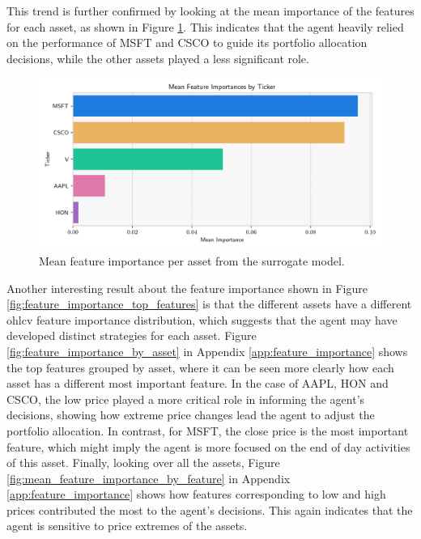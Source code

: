 This trend is further confirmed by looking at the mean importance of the features for each asset, as shown in Figure \ref{fig:mean_feature_importance_by_asset}. This indicates that the agent heavily relied on the performance of MSFT and CSCO to guide its portfolio allocation decisions, while the other assets played a less significant role. 

\begin{figure}
    \centering
    \includegraphics[width=\textwidth]{figures/feature_importance_mean_ticker.png}
    \caption{Mean feature importance per asset from the surrogate model.}
    \label{fig:mean_feature_importance_by_asset}
\end{figure}

Another interesting result about the feature importance shown in Figure \ref{fig:feature_importance_top_features} is that the different assets have a different \acrshort{ohlcv} feature importance distribution, which suggests that the agent may have developed distinct strategies for each asset. Figure \ref{fig:feature_importance_by_asset} in Appendix \ref{app:feature_importance} shows the top features grouped by asset, where it can be seen more clearly how each asset has a different most important feature. In the case of AAPL, HON and CSCO, the low price played a more critical role in informing the agent's decisions, showing how extreme price changes lead the agent to adjust the portfolio allocation. In contrast, for MSFT, the close price is the most important feature, which might imply the agent is more focused on the end of day activities of this asset. Finally, looking over all the assets, Figure \ref{fig:mean_feature_importance_by_feature} in Appendix \ref{app:feature_importance} shows how features corresponding to low and high prices contributed the most to the agent's decisions. This again indicates that the agent is sensitive to price extremes of the assets.

